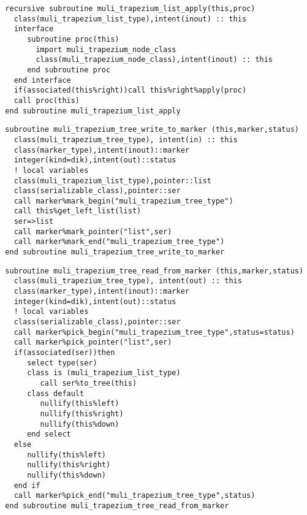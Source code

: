\begin{Verbatim}
  recursive subroutine muli_trapezium_list_apply(this,proc)
    class(muli_trapezium_list_type),intent(inout) :: this
    interface
       subroutine proc(this)
         import muli_trapezium_node_class
         class(muli_trapezium_node_class),intent(inout) :: this
       end subroutine proc
    end interface
    if(associated(this%right))call this%right%apply(proc)
    call proc(this)
  end subroutine muli_trapezium_list_apply
\end{Verbatim}
\begin{Verbatim}
  subroutine muli_trapezium_tree_write_to_marker (this,marker,status)
    class(muli_trapezium_tree_type), intent(in) :: this
    class(marker_type),intent(inout)::marker
    integer(kind=dik),intent(out)::status
    ! local variables
    class(muli_trapezium_list_type),pointer::list
    class(serializable_class),pointer::ser
    call marker%mark_begin("muli_trapezium_tree_type")
    call this%get_left_list(list)
    ser=>list
    call marker%mark_pointer("list",ser)
    call marker%mark_end("muli_trapezium_tree_type")
  end subroutine muli_trapezium_tree_write_to_marker
\end{Verbatim}

\begin{Verbatim}
  subroutine muli_trapezium_tree_read_from_marker (this,marker,status)
    class(muli_trapezium_tree_type), intent(out) :: this
    class(marker_type),intent(inout)::marker
    integer(kind=dik),intent(out)::status
    ! local variables
    class(serializable_class),pointer::ser
    call marker%pick_begin("muli_trapezium_tree_type",status=status)
    call marker%pick_pointer("list",ser)
    if(associated(ser))then
       select type(ser)
       class is (muli_trapezium_list_type)
          call ser%to_tree(this)
       class default
          nullify(this%left)
          nullify(this%right)
          nullify(this%down)
       end select
    else
       nullify(this%left)
       nullify(this%right)
       nullify(this%down)
    end if
    call marker%pick_end("muli_trapezium_tree_type",status)
  end subroutine muli_trapezium_tree_read_from_marker
\end{Verbatim}
  
